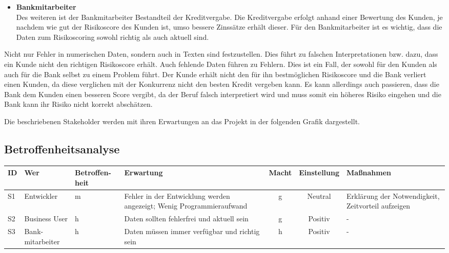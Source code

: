 \begin{itemize}
\item \textbf{Bankmitarbeiter}      \\
Des weiteren ist der Bankmitarbeiter Bestandteil der Kreditvergabe. 
Die Kreditvergabe erfolgt anhand einer Bewertung des Kunden, je nachdem wie gut der Risikoscore des Kunden ist, umso bessere Zinssätze erhält dieser.
Für den Bankmitarbeiter ist es wichtig, dass die Daten zum Risikoscoring sowohl richtig als auch aktuell sind.

\end{itemize}




Nicht nur Fehler in numerischen Daten, sondern auch in Texten sind festzustellen. 
Dies führt zu falschen Interpretationen bzw. dazu, dass ein Kunde nicht den richtigen Risikoscore erhält. 
Auch fehlende Daten führen zu Fehlern.
Dies ist ein Fall, der sowohl für den Kunden als auch für die Bank selbst zu einem Problem führt. 
Der Kunde erhält nicht den für ihn bestmöglichen Risikoscore und die Bank verliert einen Kunden, da diese verglichen mit der Konkurrenz nicht den besten Kredit vergeben kann. 
Es kann allerdings auch passieren, dass die Bank dem Kunden einen besseren Score vergibt, da der Beruf falsch interpretiert wird und muss somit ein höheres Risiko eingehen und die Bank kann ihr Risiko nicht korrekt abschätzen. 






Die beschriebenen Stakeholder werden mit ihren Erwartungen an das Projekt in der folgenden Grafik dargestellt.
\subsection{Betroffenheitsanalyse}
\begin{tabular}[h]{l|p{2cm}|>{\centering}p{1.5cm}|p{2.5cm}|c|c|p{3cm}}
ID & Wer        & Betroffen-heit & Erwartung & Macht & Einstellung & Maßnahmen  \\ \hline
S1 & Entwickler & m             & Fehler in der Entwicklung werden angezeigt; Wenig Programmieraufwand & g & Neutral & Erklärung der Notwendigkeit, Zeitvorteil aufzeigen  \\ \hline
S2 & Business User & h          & Daten sollten fehlerfrei und aktuell sein & g & Positiv & - \\ \hline
S3 & Bank-mitarbeiter & h          & Daten müssen immer verfügbar und richtig sein & h & Positiv & - \\
\end{tabular}


